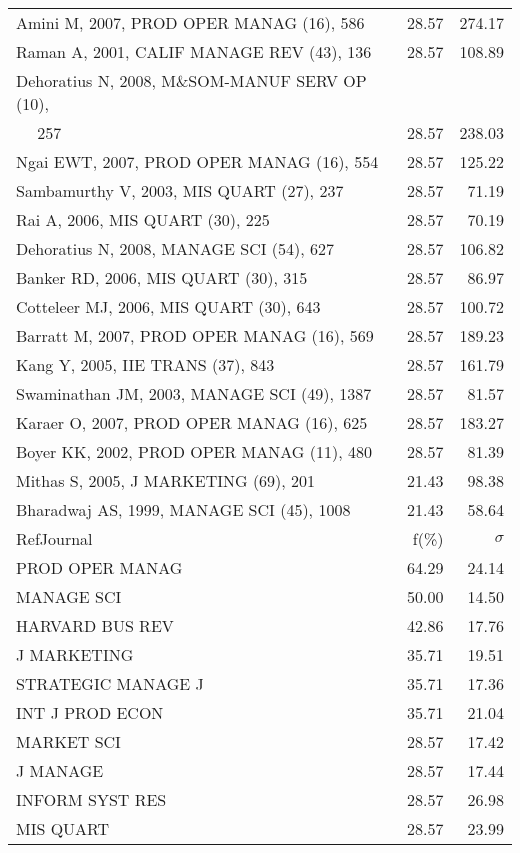 \documentclass[a4paper,11pt]{report}
\begin{document}
\begin{landscape}
\begin{table}[!ht]
{\begin{tabular}{|l r r|}
Amini M, 2007, PROD OPER MANAG (16), 586 & 28.57 & 274.17\\
Raman A, 2001, CALIF MANAGE REV (43), 136 & 28.57 & 108.89\\
Dehoratius N, 2008, M\&SOM-MANUF SERV OP (10), &  & \\
$\quad$ 257 & 28.57 & 238.03\\
Ngai EWT, 2007, PROD OPER MANAG (16), 554 & 28.57 & 125.22\\
Sambamurthy V, 2003, MIS QUART (27), 237 & 28.57 & 71.19\\
Rai A, 2006, MIS QUART (30), 225 & 28.57 & 70.19\\
Dehoratius N, 2008, MANAGE SCI (54), 627 & 28.57 & 106.82\\
Banker RD, 2006, MIS QUART (30), 315 & 28.57 & 86.97\\
Cotteleer MJ, 2006, MIS QUART (30), 643 & 28.57 & 100.72\\
Barratt M, 2007, PROD OPER MANAG (16), 569 & 28.57 & 189.23\\
Kang Y, 2005, IIE TRANS (37), 843 & 28.57 & 161.79\\
Swaminathan JM, 2003, MANAGE SCI (49), 1387 & 28.57 & 81.57\\
Karaer O, 2007, PROD OPER MANAG (16), 625 & 28.57 & 183.27\\
Boyer KK, 2002, PROD OPER MANAG (11), 480 & 28.57 & 81.39\\
Mithas S, 2005, J MARKETING (69), 201 & 21.43 & 98.38\\
Bharadwaj AS, 1999, MANAGE SCI (45), 1008 & 21.43 & 58.64\\
\hline
\hline
RefJournal & f(\%) & $\sigma$\\
\hline
PROD OPER MANAG & 64.29 & 24.14\\
MANAGE SCI & 50.00 & 14.50\\
HARVARD BUS REV & 42.86 & 17.76\\
J MARKETING & 35.71 & 19.51\\
STRATEGIC MANAGE J & 35.71 & 17.36\\
INT J PROD ECON & 35.71 & 21.04\\
MARKET SCI & 28.57 & 17.42\\
J MANAGE & 28.57 & 17.44\\
INFORM SYST RES & 28.57 & 26.98\\
MIS QUART & 28.57 & 23.99\\
\hline
\end{tabular}
}
\end{table}


\end{landscape}
\end{document}
